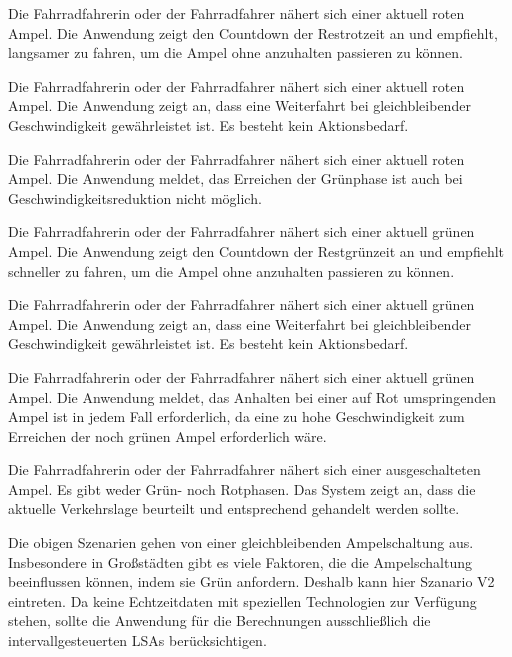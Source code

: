 \begin{description}[leftmargin=0.7cm,style=nextline]
\clearpage
\item[Szenario R1:] 
Die Fahrradfahrerin oder der Fahrradfahrer nähert sich einer aktuell roten Ampel. Die Anwendung zeigt den Countdown der Restrotzeit an und empfiehlt, langsamer zu fahren, um die Ampel ohne anzuhalten passieren zu können.  \\
\item[Szenario R2:] 
Die Fahrradfahrerin oder der Fahrradfahrer nähert sich einer aktuell roten Ampel. Die Anwendung zeigt an, dass eine Weiterfahrt bei gleichbleibender Geschwindigkeit gewährleistet ist. Es besteht kein Aktionsbedarf. \\
\item[Szenario R3:] 
Die Fahrradfahrerin oder der Fahrradfahrer nähert sich einer aktuell roten Ampel. Die Anwendung meldet, das Erreichen der Grünphase ist auch bei Geschwindigkeitsreduktion nicht möglich.\\%
\item[Szenario G1:] 
Die Fahrradfahrerin oder der Fahrradfahrer nähert sich einer aktuell grünen Ampel. Die Anwendung zeigt den Countdown der Restgrünzeit an und empfiehlt schneller zu fahren, um die Ampel ohne anzuhalten passieren zu können.\\
\item[Szenario G2:] 
Die Fahrradfahrerin oder der Fahrradfahrer nähert sich einer aktuell grünen Ampel. Die Anwendung zeigt an, dass eine Weiterfahrt bei gleichbleibender Geschwindigkeit gewährleistet ist. Es besteht kein Aktionsbedarf.\\ 
\item[Szenario G3:] 
Die Fahrradfahrerin oder der Fahrradfahrer nähert sich einer aktuell grünen Ampel. Die Anwendung meldet, das Anhalten bei einer auf Rot umspringenden Ampel ist in jedem Fall erforderlich, da eine zu hohe Geschwindigkeit zum Erreichen der noch grünen Ampel erforderlich wäre.\\
\item[Szenario V1:] 
Die Fahrradfahrerin oder der Fahrradfahrer nähert sich einer ausgeschalteten Ampel. Es gibt weder Grün- noch Rotphasen. Das System zeigt an, dass die aktuelle Verkehrslage beurteilt und entsprechend gehandelt werden sollte.\\ 
\end{description}
\clearpage
\centerline{\grayRule}
Die obigen Szenarien gehen von einer gleichbleibenden Ampelschaltung aus. Insbesondere in Großstädten gibt es viele Faktoren, die die Ampelschaltung beeinflussen können, indem sie Grün anfordern. Deshalb kann hier Szanario V2 eintreten. Da keine Echtzeitdaten mit speziellen Technologien zur Verfügung stehen, sollte die Anwendung für die Berechnungen ausschließlich die intervallgesteuerten \glspl{LSA} berücksichtigen.\\
